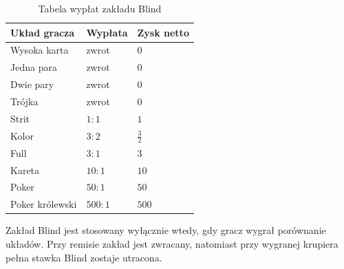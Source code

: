 \begin{table}[htbp]
    \centering
    \caption{Tabela wypłat zakładu Blind}
    \label{tab:wyplaty-blind-implementacja}
    \begin{tabular}{
        |m{}
        |>{\centering\arraybackslash}m{}
        |>{\centering\arraybackslash}m{}|
    }
        \hline
        \textbf{Układ gracza}
        &
        \textbf{Wypłata}
        &
        \textbf{Zysk netto}
        \\
        \hline

        Wysoka karta
        &
        zwrot
        &
        \(0\)
        \\
        \hline

        Jedna para
        &
        zwrot
        &
        \(0\)
        \\
        \hline

        Dwie pary
        &
        zwrot
        &
        \(0\)
        \\
        \hline

        Trójka
        &
        zwrot
        &
        \(0\)
        \\
        \hline

        Strit
        &
        \(1{:}1\)
        &
        \(1\)
        \\
        \hline

        Kolor
        &
        \(3{:}2\)
        &
        \(\frac{3}{2}\)
        \\
        \hline

        Full
        &
        \(3{:}1\)
        &
        \(3\)
        \\
        \hline

        Kareta
        &
        \(10{:}1\)
        &
        \(10\)
        \\
        \hline

        Poker
        &
        \(50{:}1\)
        &
        \(50\)
        \\
        \hline

        Poker królewski
        &
        \(500{:}1\)
        &
        \(500\)
        \\
        \hline
    \end{tabular}
\end{table}

Zakład Blind jest stosowany wyłącznie wtedy, gdy gracz wygrał porównanie układów.
Przy remisie zakład jest zwracany, natomiast przy wygranej krupiera
pełna stawka Blind zostaje utracona.

